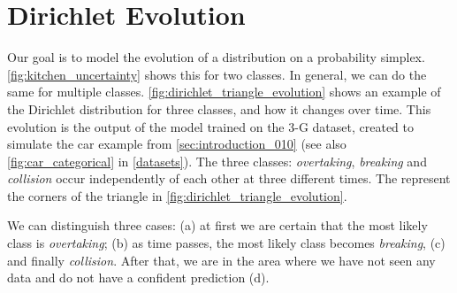 \section{Dirichlet Evolution}
\label{dirichlet_triangle_evolution}

Our goal is to model the evolution of a distribution on a probability simplex. \cref{fig:kitchen_uncertainty} shows this for two classes. In general, we can do the same for multiple classes. \cref{fig:dirichlet_triangle_evolution} shows an example of the  Dirichlet distribution for three classes, and how it changes over time. This evolution is the output of the \DirModel model trained on the 3-G dataset, created to simulate the car example from \cref{sec:introduction_010} (see also \cref{fig:car_categorical} in \cref{datasets}). The three classes: \textit{overtaking}, \textit{breaking} and \textit{collision} occur independently of each other at three different times. The represent the corners of the triangle in \cref{fig:dirichlet_triangle_evolution}.

We can distinguish three cases: (a) at first we are certain that the most likely class is \textit{overtaking}; (b) as time passes, the most likely class becomes \textit{breaking}, (c) and finally \textit{collision}. After that, we are in the area where we have not seen any data and do not have a confident prediction (d).

